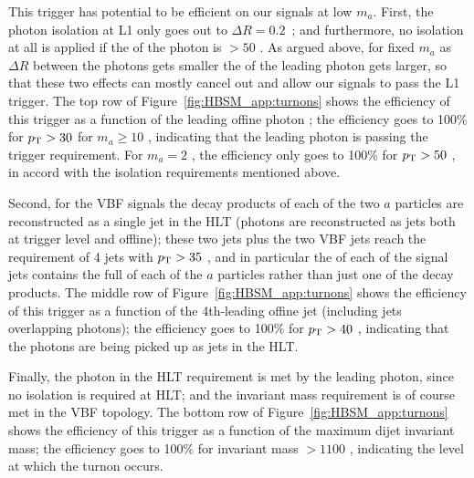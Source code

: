 This trigger has potential to be efficient on our signals at low $m_a$.
First, the photon isolation at L1 only goes out to $\Delta R=0.2$~\cite{Aad:2019wsl}; and furthermore, no isolation at all is applied if the \pt{} of the photon is $>50$ \GeV{}.
As argued above, for fixed $m_a$ as $\Delta R$ between the photons gets smaller the \pt{} of the leading photon gets larger, so that these two effects can mostly cancel out and allow our signals to pass the L1 trigger.
The top row of Figure~\ref{fig:HBSM_app:turnons} shows the efficiency of this trigger as a function of the leading offine photon \pt{}; the efficiency goes to 100\% for $p_{\text{T}}{}>30$ \GeV{} for $m_a \ge 10$ \GeV{}, indicating that the leading photon is passing the trigger requirement.
For $m_a=2$ \GeV{}, the efficiency only goes to 100\% for $p_{\text{T}}{}>50$ \GeV{}, in accord with the isolation requirements mentioned above.

Second, for the VBF signals the decay products of each of the two $a$ particles are reconstructed as a single jet in the HLT (photons are reconstructed as jets both at trigger level and offline); these two jets plus the two VBF jets reach the requirement of 4 jets with $p_{\text{T}}{}>35$ \GeV{}, and in particular the \pt{} of each of the signal jets contains the full \pt{} of each of the $a$ particles rather than just one of the decay products.
The middle row of Figure~\ref{fig:HBSM_app:turnons} shows the efficiency of this trigger as a function of the 4th-leading offine jet \pt{} (including jets overlapping photons); the efficiency goes to 100\% for $p_{\text{T}}{}>40$ \GeV{}, indicating that the photons are being picked up as jets in the HLT.

Finally, the photon in the HLT requirement is met by the leading photon, since no isolation is required at HLT; and the invariant mass requirement is of course met in the VBF topology.
The bottom row of Figure~\ref{fig:HBSM_app:turnons} shows the efficiency of this trigger as a function of the maximum dijet invariant mass; the efficiency goes to 100\% for invariant mass $>1100$ \GeV{}, indicating the level at which the turnon occurs.

